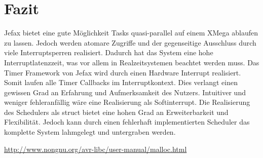 \documentclass[fontsize=12pt, toc=bibliography, notitlepage]{scrreprt}
\begin{document}

\chapter{Fazit}
\label{chap:fazit}

Jefax bietet eine gute Möglichkeit Tasks quasi-parallel auf einem XMega ablaufen zu lassen. Jedoch werden atomare Zugriffe und der gegenseitige Ausschluss durch viele Interruptsperren realisiert. Dadurch hat das System eine hohe Interruptlatenzzeit, was vor allem in Realzeitsystemen beachtet werden muss.
Das Timer Framework von Jefax wird durch einen Hardware Interrupt realisiert. Somit laufen alle Timer Callbacks im Interruptkontext. Dies verlangt einen gewissen Grad an Erfahrung und Aufmerksamkeit des Nutzers. Intuitiver und weniger fehleranfällig wäre eine Realisierung als Softinterrupt.
Die Realisierung des Schedulers als struct bietet eine hohen Grad an Erweiterbarkeit und Flexibilität. Jedoch kann durch einen fehlerhaft implementierten Scheduler das komplette System lahmgelegt und untergraben werden.

\begin{thebibliography}{999}
 \url{http://www.nongnu.org/avr-libc/user-manual/malloc.html}
\end{thebibliography}

\cleardoublepage
{}
\listoffigures
\end{document}
